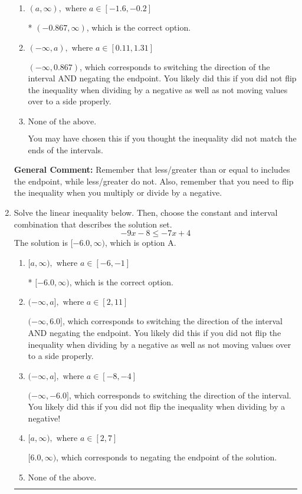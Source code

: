 \documentclass{extbook}[14pt]
\newcommand{\litem}[1]{\item #1

\rule{\textwidth}{0.4pt}}
\begin{document}
\begin{enumerate}
{\begin{enumerate}[label=\Alph*.]
 $(-\infty, -0.867)$, which corresponds to switching the direction of the interval. You likely did this if you did not flip the inequality when dividing by a negative!
\item \( (a, \infty), \text{ where } a \in [-1.6, -0.2] \)

* $(-0.867, \infty)$, which is the correct option.
\item \( (-\infty, a), \text{ where } a \in [0.11, 1.31] \)

 $(-\infty, 0.867)$, which corresponds to switching the direction of the interval AND negating the endpoint. You likely did this if you did not flip the inequality when dividing by a negative as well as not moving values over to a side properly.
\item \( \text{None of the above}. \)

You may have chosen this if you thought the inequality did not match the ends of the intervals.
\end{enumerate}

\textbf{General Comment:} Remember that less/greater than or equal to includes the endpoint, while less/greater do not. Also, remember that you need to flip the inequality when you multiply or divide by a negative.
}
\litem{
Solve the linear inequality below. Then, choose the constant and interval combination that describes the solution set.
\[ -9x -8 \leq -7x + 4 \]The solution is \( [-6.0, \infty) \), which is option A.\begin{enumerate}[label=\Alph*.]
\item \( [a, \infty), \text{ where } a \in [-6, -1] \)

* $[-6.0, \infty)$, which is the correct option.
\item \( (-\infty, a], \text{ where } a \in [2, 11] \)

 $(-\infty, 6.0]$, which corresponds to switching the direction of the interval AND negating the endpoint. You likely did this if you did not flip the inequality when dividing by a negative as well as not moving values over to a side properly.
\item \( (-\infty, a], \text{ where } a \in [-8, -4] \)

 $(-\infty, -6.0]$, which corresponds to switching the direction of the interval. You likely did this if you did not flip the inequality when dividing by a negative!
\item \( [a, \infty), \text{ where } a \in [2, 7] \)

 $[6.0, \infty)$, which corresponds to negating the endpoint of the solution.
\item \( \text{None of the above}. \)


\end{enumerate}}
\end{enumerate}
\end{document}

